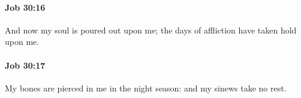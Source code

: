 		\paragraph{Job 30:16} %
			\label{JOB-30-16}

			And now my soul is poured out upon me; the days of affliction have taken hold upon me.


		\paragraph{Job 30:17} %
			\label{JOB-30-17}

			My bones are pierced in me in the night season: and my sinews take no rest.


